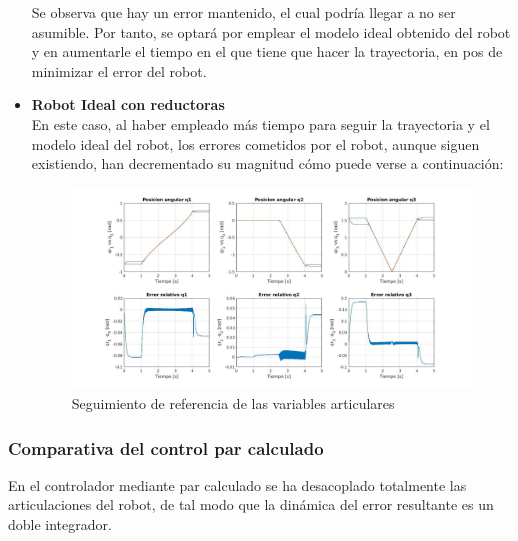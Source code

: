 \begin{itemize}
\begin{figure}[h!]
	\end{figure}



	Se observa que hay un error mantenido, el cual podría llegar a no ser asumible. Por tanto, se optará por emplear el modelo ideal obtenido del robot y en aumentarle el tiempo en el que tiene que hacer la trayectoria, en pos de minimizar el error del robot.




	\newpage
	\item \textbf{Robot Ideal con reductoras} \\

	En este caso, al haber empleado más tiempo para seguir la trayectoria y el modelo ideal del robot, los errores cometidos por el robot, aunque siguen existiendo, han decrementado su magnitud cómo puede verse a continuación:



	\begin{figure}[h!]

		\centering

		\includegraphics[width=.8\textwidth]{exp3_posPDidealCR_circular_lento}

		\caption{Seguimiento de referencia de las variables articulares}

	\end{figure}



\end{itemize}



\subsubsection{Comparativa del control par calculado}

En el controlador mediante par calculado se ha desacoplado totalmente las articulaciones del robot, de tal modo que la dinámica del error resultante es un doble integrador. \\

